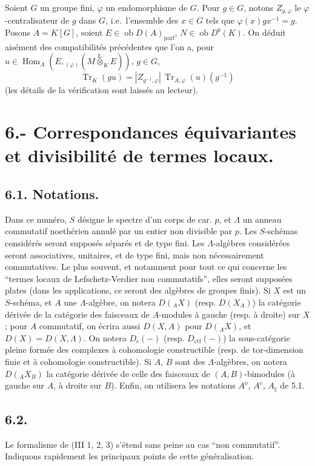 \documentclass[11pt]{article}
\DeclareMathOperator{\Hom}{Hom}
\newcommand{\ob}{\operatorname{ob}}
\providecommand{\Tr}{\operatorname{Tr}}
\providecommand{\Tr}{\operatorname{Tr}}
\providecommand{\lten}{\overset{\mathrm L}{\otimes}}
\providecommand{\Tr}{\operatorname{Tr}}
\providecommand{\Hom}{\operatorname{Hom}}
\providecommand{\ob}{\operatorname{ob}}
\providecommand{\lten}{\overset{\mathrm L}{\otimes}}
\providecommand{\lten}{\overset{\mathrm L}{\otimes}}
\providecommand{\Tr}{\operatorname{Tr}}
\providecommand{\lten}{\overset{\mathrm L}{\otimes}}
\providecommand{\lten}{\overset{\mathrm L}{\otimes}}
\providecommand{\lten}{\overset{\mathrm L}{\otimes}}
\providecommand{\Hom}{\operatorname{Hom}}
\providecommand{\Tr}{\operatorname{Tr}}
\providecommand{\lten}{\overset{\mathrm L}{\otimes}}
\begin{document}
Soient $G$ un groupe fini, $\varphi$ un endomorphisme de $G$. Pour $g\in G$, notons $Z_{g,\varphi}$ le $\varphi$-centralisateur de $g$ dans $G$, i.e.~l'ensemble des $x\in G$ tels que $\varphi(x)gx^{-1}=g$. Posons $A=K[G]$, soient $E\in\ob D(A)_{\mathrm{parf}}$, $N\in\ob D^b(K)$. On déduit aisément des compatibilités précédentes que l'on a, pour $u\in\Hom_A(E,{}_{(\varphi)}(M\lten_KE))$, $g\in G$,
\begin{equation}\tag{5.13.5}
\Tr_K(gu)=|Z_{g^{-1},\varphi}|\,\Tr_{A,\varphi}(u)(g^{-1})
\end{equation}
(les détails de la vérification sont laissés au lecteur).

\section*{6.- Correspondances équivariantes et divisibilité de termes locaux.}

\subsection*{6.1. Notations.}

Dans ce numéro, $S$ désigne le spectre d'un corps de car. $p$, et $\Lambda$ un anneau commutatif noethérien annulé par un entier non divisible par $p$. Les $S$-schémas considérés seront supposés séparés et de type fini. Les $\Lambda$-algèbres considérées seront associatives, unitaires, et de type fini, mais non nécessairement commutatives. Le plus souvent, et notamment pour tout ce qui concerne les ``termes locaux de Lefschetz-Verdier non commutatifs'', elles seront supposées plates (dans les applications, ce seront des algèbres de groupes finis). Si $X$ est un $S$-schéma, et $A$ une $\Lambda$-algèbre, on notera $D({}_AX)$ (resp. $D(X_A)$) la catégorie dérivée de la catégorie des faisceaux de $A$-modules à gauche (resp. à droite) sur $X$; pour $A$ commutatif, on écrira aussi $D(X,A)$ pour $D({}_AX)$, et $D(X)=D(X,\Lambda)$. On notera $D_c(-)$ (resp. $D_{\mathrm{ctf}}(-)$) la sous-catégorie pleine formée des complexes à cohomologie constructible (resp. de tor-dimension finie et à cohomologie constructible). Si $A$, $B$ sont des $\Lambda$-algèbres, on notera $D({}_AX_B)$ la catégorie dérivée de celle des faisceaux de $(A,B)$-bimodules (à gauche sur $A$, à droite sur $B$). Enfin, on utilisera les notations $A^o$, $A^e$, $A_{\natural}$ de 5.1.

\subsection*{6.2.}
Le formalisme de (III 1, 2, 3) s'étend sans peine au cas ``non commutatif''. Indiquons rapidement les principaux points de cette généralisation.
\end{document}

